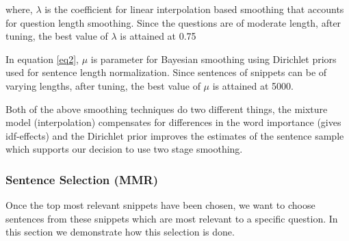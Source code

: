 where, $\lambda$ is the coefficient for linear interpolation based smoothing that accounts for question length smoothing. Since the questions are of moderate length, after tuning, the best value of $\lambda$ is attained at 0.75

In equation \ref{eq2}, $\mu$ is parameter for Bayesian smoothing using Dirichlet priors used for sentence length normalization. Since sentences of snippets can be of varying lengths, after tuning, the best value of $\mu$ is attained at 5000.

Both of the above smoothing techniques do two different things, the mixture model (interpolation) compensates for differences in the word importance (gives idf-effects) and the Dirichlet prior improves the estimates of the sentence sample which supports our decision to use two stage smoothing. 




\subsubsection{Sentence Selection (MMR)}
Once the top most relevant snippets have been chosen, we want to choose sentences from these snippets which are most relevant to a specific question. In this section we demonstrate how this selection is done.

